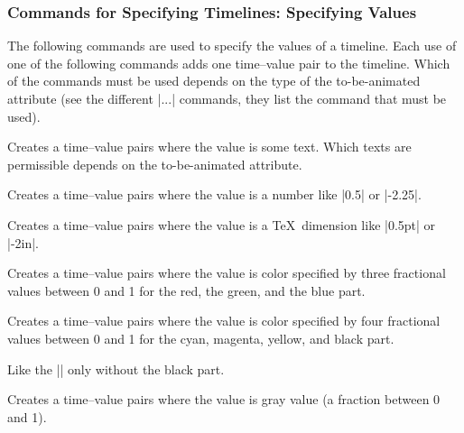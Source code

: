 \subsubsection{Commands for Specifying Timelines: Specifying Values}

The following commands are used to specify the values of a
timeline. Each use of one of the following commands adds one
time--value pair to the timeline. Which of the commands must be used
depends on the type of the to-be-animated attribute (see the different
|\pgfsys@animate...| commands, they list the command that must be
used). 


\begin{command}{\pgfsys@animation@val@text{}}
  Creates a time--value pairs where the value is some text. Which
  texts are permissible depends on the to-be-animated attribute.
\end{command}

\begin{command}{\pgfsys@animation@val@scalar{}}
  Creates a time--value pairs where the value is a number like |0.5|
  or |-2.25|.
\end{command}

\begin{command}{\pgfsys@animation@val@dimension{}}
  Creates a time--value pairs where the value is a \TeX\ dimension
  like |0.5pt| or |-2in|.
\end{command}

\begin{command}{\pgfsys@animation@val@color@rgb{}}
  Creates a time--value pairs where the value is color
  specified by three fractional values between 0 and 1 for the red,
  the green, and the blue part.
\end{command}

\begin{command}{\pgfsys@animation@val@color@cmyk{}}
  Creates a time--value pairs where the value is color
  specified by four fractional values between 0 and 1 for the cyan,
  magenta, yellow, and black part.
\end{command}

\begin{command}{\pgfsys@animation@val@color@cmy{}}
  Like the |\pgfsys@animation@color@cmyk| only without the black part.
\end{command}

\begin{command}{\pgfsys@animation@color@gray{}}
  Creates a time--value pairs where the value is gray value (a
  fraction between 0 and 1).
\end{command}


